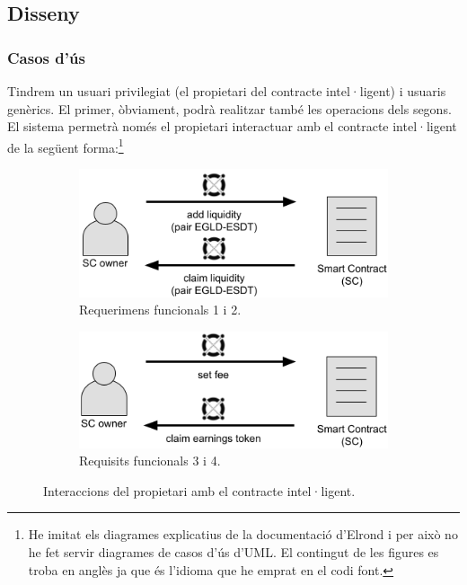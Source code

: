 \documentclass[11pt,a4paper]{article}
\begin{document}
\subsection{Disseny}

\subsubsection{Casos d'ús}\label{subsub:casosdus}

Tindrem un usuari privilegiat (el propietari del contracte intel·ligent) i usuaris genèrics. El primer, òbviament, podrà realitzar també les operacions dels segons. El sistema permetrà només el propietari interactuar amb el contracte intel·ligent de la següent forma:{\footnote{He imitat els diagrames explicatius de la documentació d'Elrond \cite{elrond2022} i per això no he fet servir diagrames de casos d'ús d'UML. El contingut de les figures es troba en anglès ja que és l'idioma que he emprat en el codi font.}}

\begin{figure}[!htb]
\begin{subfigure}[b]{0.485\textwidth}
  \includegraphics[width=\linewidth]{cu_add_claim_liquidity.png}
  \caption{Requerimens funcionals 1 i 2.}\label{fig:addclaimliq}
\end{subfigure}\hfill
\begin{subfigure}[b]{0.49\textwidth}
  \includegraphics[width=\linewidth]{cu_set_fee_claim_earnings.png}
  \caption{Requisits funcionals 3 i 4.}\label{fig:setfeeclaim}
\end{subfigure}\hfill
\caption{Interaccions del propietari amb el contracte intel·ligent.}
\end{figure}
\end{document}
